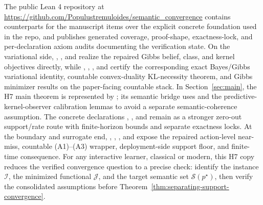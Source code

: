 \documentclass[11pt]{article}
\theoremstyle{definition}
\theoremstyle{remark}
\newcommand{\Scal}{\mathcal{S}}
\begin{document}
The public Lean 4 repository at \url{https://github.com/Populustremuloides/semantic_convergence} contains counterparts for the manuscript items over the explicit concrete foundation used in the repo, and publishes generated coverage, proof-shape, exactness-lock, and per-declaration axiom audits documenting the verification state. On the variational side, , , and  realize the repaired Gibbs belief, class, and kernel objectives directly, while , , , and  certify the corresponding exact Bayes/Gibbs variational identity, countable convex-duality KL-necessity theorem, and Gibbs minimizer results on the paper-facing countable stack. In Section~\ref{sec:main}, the H7 main theorem is represented by ; its semantic bridge uses  and the predictive-kernel-observer calibration lemmas to avoid a separate semantic-coherence assumption. The concrete declarations , , and  remain as a stronger zero-out support/rate route with finite-horizon bounds and separate exactness locks. At the boundary and surrogate end, , , , and  expose the repaired action-level near-miss, countable \textup{(A1)--(A3)} wrapper, deployment-side support floor, and finite-time consequence. For any interactive learner, classical or modern, this H7 copy reduces the verified convergence question to a precise check: identify the instance $\mathcal I$, the minimized functional $\mathcal J$, and the target semantic set $\Scal(p^\star)$, then verify the consolidated assumptions before Theorem~\ref{thm:separating-support-convergence}.

%
\end{document}
